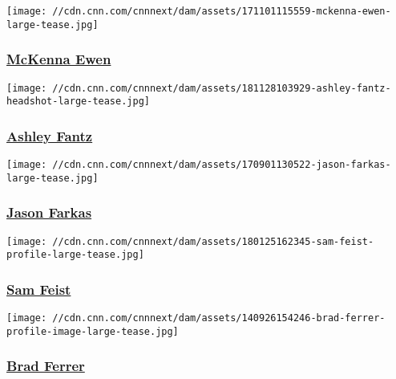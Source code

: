 \href{/profiles/mckenna-ewen}{}

\texttt{[image: //cdn.cnn.com/cnnnext/dam/assets/171101115559-mckenna-ewen-large-tease.jpg]}

\hypertarget{mckenna-ewen}{%
\subsubsection{\texorpdfstring{\href{/profiles/mckenna-ewen}{McKenna
Ewen}}{McKenna Ewen}}\label{mckenna-ewen}}

\href{/profiles/ashley-fantz-profile}{}

\texttt{[image: //cdn.cnn.com/cnnnext/dam/assets/181128103929-ashley-fantz-headshot-large-tease.jpg]}

\hypertarget{ashley-fantz}{%
\subsubsection{\texorpdfstring{\href{/profiles/ashley-fantz-profile}{Ashley
Fantz}}{Ashley Fantz}}\label{ashley-fantz}}

\href{/profiles/jason-farkas}{}

\texttt{[image: //cdn.cnn.com/cnnnext/dam/assets/170901130522-jason-farkas-large-tease.jpg]}

\hypertarget{jason-farkas}{%
\subsubsection{\texorpdfstring{\href{/profiles/jason-farkas}{Jason
Farkas}}{Jason Farkas}}\label{jason-farkas}}

\href{/profiles/sam-feist-profile}{}

\texttt{[image: //cdn.cnn.com/cnnnext/dam/assets/180125162345-sam-feist-profile-large-tease.jpg]}

\hypertarget{sam-feist}{%
\subsubsection{\texorpdfstring{\href{/profiles/sam-feist-profile}{Sam
Feist}}{Sam Feist}}\label{sam-feist}}

\href{/profiles/brad-ferrer-profile}{}

\texttt{[image: //cdn.cnn.com/cnnnext/dam/assets/140926154246-brad-ferrer-profile-image-large-tease.jpg]}

\hypertarget{brad-ferrer}{%
\subsubsection{\texorpdfstring{\href{/profiles/brad-ferrer-profile}{Brad
Ferrer}}{Brad Ferrer}}\label{brad-ferrer}}

